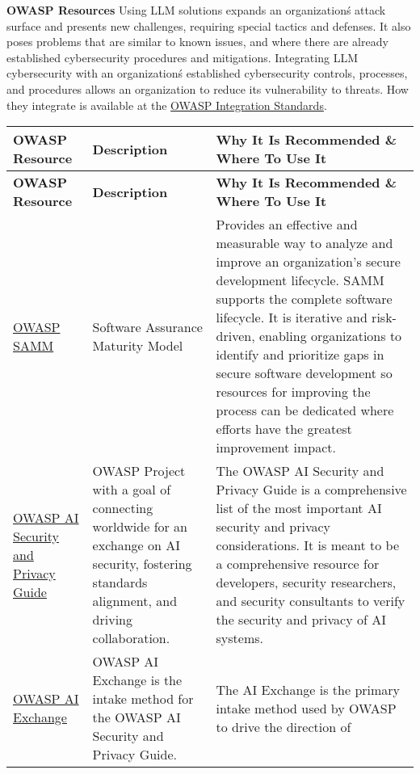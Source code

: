 \clearpage
\textbf{OWASP Resources}
Using LLM solutions expands an organization\'s attack surface and presents new challenges, requiring special tactics and defenses. It also poses problems that are similar to known issues, and where there are already established cybersecurity procedures and mitigations. Integrating LLM cybersecurity with an organization\'s established cybersecurity controls, processes, and procedures allows an organization to reduce its vulnerability to threats. How they integrate is available at the \href{https://owasp.org/www-project-integration-standards/}{OWASP Integration Standards}.
\setlength\LTleft{0pt}
\setlength\LTright{0pt}
\begin{longtable}[c]{|p{}|p{}|p{}|}
  \hline
  \rowcolor{owasplightpurple}
  \textbf{OWASP Resource} &
  \textbf{Description} &
  \textbf{Why It Is Recommended \& Where To Use It} \\
  \hline
  \endfirsthead
  \hline
  \rowcolor{owasplightpurple}
  \textbf{OWASP Resource} &
  \textbf{Description} &
  \textbf{Why It Is Recommended \& Where To Use It} \\
  \hline
  \endhead
  \endfoot
  \href{https://owasp.org/www-project-samm/}{OWASP SAMM}&
  Software Assurance Maturity Model &
  Provides an effective and measurable way to analyze and improve an organization's secure development lifecycle. SAMM supports the complete software lifecycle. It is iterative and risk-driven, enabling organizations to identify and prioritize gaps in secure software development so resources for improving the process can be dedicated where efforts have the greatest improvement impact. \\
  \hline
  \href{https://owasp.org/www-project-ai-security-and-privacy-guide/}{OWASP AI Security and Privacy Guide} &
  OWASP Project with a goal of connecting worldwide for an exchange on AI
  security, fostering standards alignment, and driving collaboration. &
  The OWASP AI Security and Privacy Guide is a comprehensive list of the most
  important AI security and privacy considerations. It is meant to be a
  comprehensive resource for developers, security researchers, and security
  consultants to verify the security and privacy of AI systems. \\
  \hline
  \href{https://owasp.org/www-project-ai-security/}{OWASP AI Exchange} &
  OWASP AI Exchange is the intake method for the OWASP AI Security and Privacy Guide. &
  The AI Exchange is the primary intake method used by OWASP to drive the direction of

\end{longtable}
